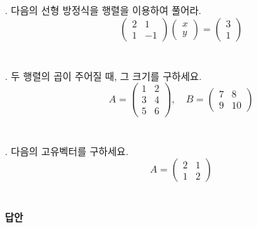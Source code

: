 \documentclass[fleqn]{article}
\begin{document}
. 다음의 선형 방정식을 행렬을 이용하여 풀어라.
\[
\begin{pmatrix}
2 & 1 \\
1 & -1
\end{pmatrix} \begin{pmatrix}
x \\
y
\end{pmatrix} = \begin{pmatrix}
3 \\
1
\end{pmatrix}
\]
\ \\\\

. 두 행렬의 곱이 주어질 때, 그 크기를 구하세요.
\[
A = \begin{pmatrix}
1 & 2 \\
3 & 4 \\
5 & 6
\end{pmatrix}, \quad B = \begin{pmatrix}
7 & 8 \\
9 & 10
\end{pmatrix}
\]
\ \\\\

. 다음의 고유벡터를 구하세요.
\[
A = \begin{pmatrix}
2 & 1 \\
1 & 2
\end{pmatrix}
\]
\ \\\\

\textbf{답안}
\end{document}
